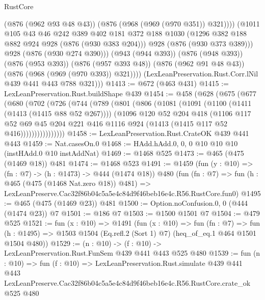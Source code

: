\begin{lexlean}{RustCore}
\begin{coremodule}
                  (@876 (@962 @93 @48 @43))
                  (@876 (@968 (@969 (@970 @351)) @321))))
              (@1011
                @105
                @43
                @46
                @242
                @389
                @402
                @181
                @372
                @188
                @1030
                (@1296 @382 @188 @882 @924 @928 (@876 (@930 @383 @204)))
                @928
                (@876 (@930 @373 @389)))
              @928
              (@876 (@930 @274 @390)))
            (@943 (@944 @393))
            (@876 (@948 @393))
            (@876 (@953 @393))
            (@876 (@957 @393 @48))
            (@876 (@962 @91 @48 @43))
            (@876 (@968 (@969 (@970 @393)) @321))))
        (LexLeanPreservation.Rust.Corr.lNil @439 @441 @443 @788 @321)))
@1413 := @672 (@463 @431)
@1415 := LexLeanPreservation.Rust.buildShape @439
@1454 := @458
    (@628
      (@675
        (@677
          (@680
            (@702
              (@726
                (@744
                  (@789
                    (@801
                      (@806
                        (@1081
                          (@1091
                            (@1100 (@1411 (@1413 (@1415 @88 @52 @267))))
                            (@1096
                              @120
                              @52
                              @204
                              @418
                              (@1106
                                @117
                                @52
                                @69
                                @45
                                @204
                                @221
                                @416
                                @1116
                                @924
                                (@1413 (@1415 @117 @52 @416))))))))))))))))
@1458 := LexLeanPreservation.Rust.CrateOK @439 @441 @443
@1459 := Nat.casesOn.{0}
@1468 := HAdd.hAdd.{0, 0, 0} @10 @10 @10 (instHAdd.{0} @10 instAddNat)
@1469 := @1468 @525
@1473 := @465 (@475 (@1469 @18)) @481
@1474 := @1468 @523
@1491 := @1459
    (fun (y : @10) => (fn : @7) -> (h : @1473) -> @444 (@1474 @18))
    @480
    (fun (fn : @7) =>
    fun (h : @465 (@475 (@1468 Nat.zero @18)) @481) =>
    LexLeanPreserve.Cac32f86b04c5a5e4c84d9f46beb16e4c.R56.RustCore.fun0)
@1495 := @465 (@475 (@1469 @23)) @481
@1500 := Option.noConfusion.{0, 0} (@444 (@1474 @23)) @7
@1501 := @186 @7
@1503 := @1500 @1501 @7
@1504 := @479 @525
@1521 := fun (x : @10) =>
  @1491
    (fun (x : @10) =>
    fun (fn : @7) =>
    fun (h : @1495) => @1503 @1504 (Eq.refl.{2} (Sort 1) @7) (heq_of_eq.{1} @464 @1501 @1504 @480))
@1529 := (n : @10) -> (f : @10) -> LexLeanPreservation.Rust.FunSem @439 @441 @443 @525 @480
@1539 := fun (n : @10) =>
  fun (f : @10) =>
  LexLeanPreservation.Rust.simulate
    @439
    @441
    @443
    LexLeanPreserve.Cac32f86b04c5a5e4c84d9f46beb16e4c.R56.RustCore.crate_ok
    @525
    @480
\end{coremodule}
\end{lexlean}
